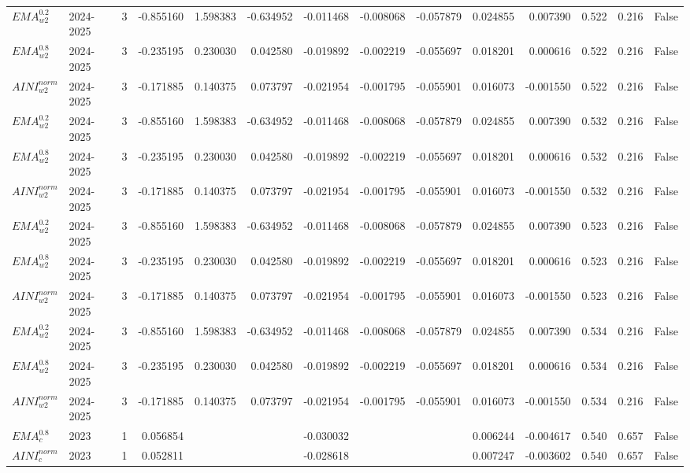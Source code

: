 \begin{tabular}{@{}llrrrrrrrrrlll@{}}
$EMA^{0.2}_{w2}$ & 2024-2025 & 3 & -0.855160 & 1.598383 & -0.634952 & -0.011468 & -0.008068 & -0.057879 & 0.024855 & 0.007390 & 0.522 & 0.216 & False \\
$EMA^{0.8}_{w2}$ & 2024-2025 & 3 & -0.235195 & 0.230030 & 0.042580 & -0.019892 & -0.002219 & -0.055697 & 0.018201 & 0.000616 & 0.522 & 0.216 & False \\
$AINI^{norm}_{w2}$ & 2024-2025 & 3 & -0.171885 & 0.140375 & 0.073797 & -0.021954 & -0.001795 & -0.055901 & 0.016073 & -0.001550 & 0.522 & 0.216 & False \\
$EMA^{0.2}_{w2}$ & 2024-2025 & 3 & -0.855160 & 1.598383 & -0.634952 & -0.011468 & -0.008068 & -0.057879 & 0.024855 & 0.007390 & 0.532 & 0.216 & False \\
$EMA^{0.8}_{w2}$ & 2024-2025 & 3 & -0.235195 & 0.230030 & 0.042580 & -0.019892 & -0.002219 & -0.055697 & 0.018201 & 0.000616 & 0.532 & 0.216 & False \\
$AINI^{norm}_{w2}$ & 2024-2025 & 3 & -0.171885 & 0.140375 & 0.073797 & -0.021954 & -0.001795 & -0.055901 & 0.016073 & -0.001550 & 0.532 & 0.216 & False \\
$EMA^{0.2}_{w2}$ & 2024-2025 & 3 & -0.855160 & 1.598383 & -0.634952 & -0.011468 & -0.008068 & -0.057879 & 0.024855 & 0.007390 & 0.523 & 0.216 & False \\
$EMA^{0.8}_{w2}$ & 2024-2025 & 3 & -0.235195 & 0.230030 & 0.042580 & -0.019892 & -0.002219 & -0.055697 & 0.018201 & 0.000616 & 0.523 & 0.216 & False \\
$AINI^{norm}_{w2}$ & 2024-2025 & 3 & -0.171885 & 0.140375 & 0.073797 & -0.021954 & -0.001795 & -0.055901 & 0.016073 & -0.001550 & 0.523 & 0.216 & False \\
$EMA^{0.2}_{w2}$ & 2024-2025 & 3 & -0.855160 & 1.598383 & -0.634952 & -0.011468 & -0.008068 & -0.057879 & 0.024855 & 0.007390 & 0.534 & 0.216 & False \\
$EMA^{0.8}_{w2}$ & 2024-2025 & 3 & -0.235195 & 0.230030 & 0.042580 & -0.019892 & -0.002219 & -0.055697 & 0.018201 & 0.000616 & 0.534 & 0.216 & False \\
$AINI^{norm}_{w2}$ & 2024-2025 & 3 & -0.171885 & 0.140375 & 0.073797 & -0.021954 & -0.001795 & -0.055901 & 0.016073 & -0.001550 & 0.534 & 0.216 & False \\
$EMA^{0.8}_{c}$ & 2023 & 1 & 0.056854 &  &  & -0.030032 &  &  & 0.006244 & -0.004617 & 0.540 & 0.657 & False \\
$AINI^{norm}_{c}$ & 2023 & 1 & 0.052811 &  &  & -0.028618 &  &  & 0.007247 & -0.003602 & 0.540 & 0.657 & False \\

\end{tabular}
